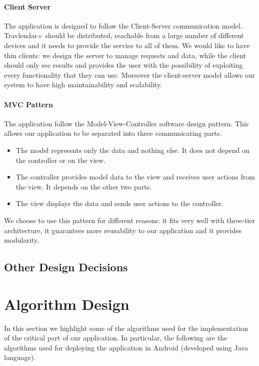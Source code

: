 \documentclass[12pt,titlepage]{article}
\begin{document}
\paragraph{Client Server}
The application is designed to follow the Client-Server communication model. Travlendar+ should be distributed, reachable from a large number of different devices and it needs to provide the service to all of them.
We would like to have thin clients: we design the server to manage requests and data, while the client should only see results and provides the user with the possibility of exploiting every functionality that they can use.
Moreover the client-server model allows our system to have high maintainability and scalability.


\paragraph{MVC Pattern} The application follow the Model-View-Controller software design pattern. This allows our application to be separated into three communicating parts.
\begin{itemize}
\item The model represents only the data and nothing else. It does not depend on the controller or on the view.
\item The controller provides model data to the view and receives user actions from the view. It depends on the other two parts.
\item The view displays the data and sends user actions to the controller.
\end{itemize}
We choose to use this pattern for different reasons: it fits very well with three-tier architecture, it guarantees more reusability to our application and it provides modularity.

\subsection{Other Design Decisions}

\section{Algorithm Design}
In this section we highlight some of the algorithms used for the implementation of the critical part of our application. In particular, the following are the algorithms used for deploying the application in Android (developed using Java language). 
\end{document}
